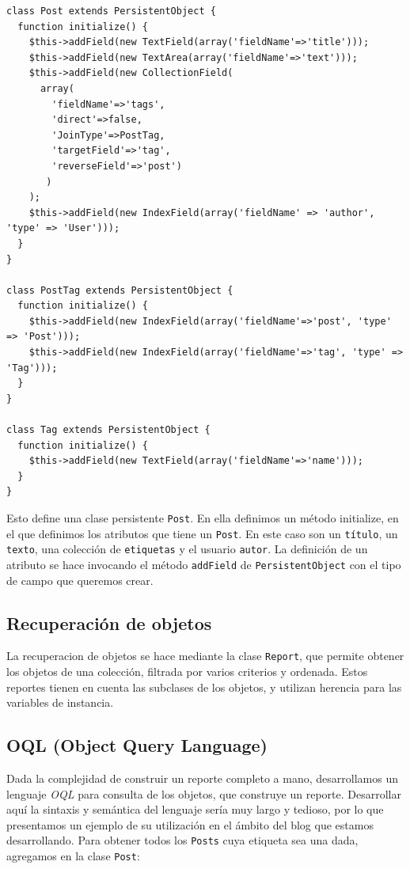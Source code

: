 \begin{verbatim}
class Post extends PersistentObject {
  function initialize() {
    $this->addField(new TextField(array('fieldName'=>'title')));
    $this->addField(new TextArea(array('fieldName'=>'text')));
    $this->addField(new CollectionField(
      array(
        'fieldName'=>'tags',
        'direct'=>false,
        'JoinType'=>PostTag,
        'targetField'=>'tag',
        'reverseField'=>'post')
       )
    );
    $this->addField(new IndexField(array('fieldName' => 'author', 'type' => 'User')));
  }
}

class PostTag extends PersistentObject {
  function initialize() {
    $this->addField(new IndexField(array('fieldName'=>'post', 'type' => 'Post')));
    $this->addField(new IndexField(array('fieldName'=>'tag', 'type' => 'Tag')));
  }
}

class Tag extends PersistentObject {
  function initialize() {
    $this->addField(new TextField(array('fieldName'=>'name')));
  }
}
\end{verbatim}

Esto define una clase persistente \verb"Post". En ella definimos un método initialize, en el que definimos los atributos que tiene un \verb"Post". En este caso son un \verb"título", un \verb"texto", una colección de \verb"etiquetas" y el usuario \verb"autor". La definición de un atributo se hace invocando el método \verb"addField" de \verb"PersistentObject" con el tipo de campo que queremos crear.

\subsection{Recuperación de objetos}
La recuperacion de objetos se hace mediante la clase \verb"Report", que permite obtener los objetos de una colección, filtrada por varios criterios y ordenada. Estos reportes tienen en cuenta las subclases de los objetos, y utilizan herencia para las variables de instancia.

\subsection{OQL (Object Query Language)}
\label{sub-oql}
Dada la complejidad de construir un reporte completo a mano, desarrollamos un lenguaje \emph{OQL} para consulta de los objetos, que construye un reporte. Desarrollar aquí la sintaxis y semántica del lenguaje sería muy largo y tedioso, por lo que presentamos un ejemplo de su utilización en el ámbito del blog que estamos desarrollando. Para obtener todos los \verb"Posts" cuya etiqueta sea una dada, agregamos en la clase \verb"Post":

